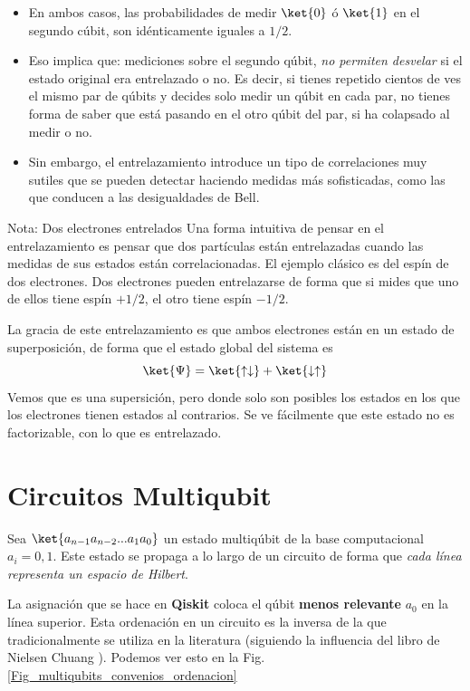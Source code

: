 \documentclass[a4paper,11pt]{book} %
\numberwithin{equation}{chapter}
\begin{document}
\begin{itemize}
	\item En ambos casos,  las probabilidades de medir $\ket{0}$ ó $\ket{1}$ en el segundo cúbit, son idénticamente iguales a $1/2$.
	
	\item Eso implica que: mediciones sobre el segundo qúbit, \textit{no permiten desvelar} si el estado original era entrelazado o no. Es decir, si tienes repetido cientos de ves el mismo par de qúbits y decides solo medir un qúbit en cada par, no tienes forma de saber que está pasando en el otro qúbit del par, si ha colapsado al medir o no.
	
	\item Sin embargo, el entrelazamiento introduce un tipo de correlaciones muy sutiles que se pueden detectar haciendo medidas más sofisticadas, como las que conducen a las desigualdades de Bell. 
\end{itemize}


	\begin{mybox_blue}{Nota: Dos electrones entrelados}
	Una forma intuitiva de pensar en el entrelazamiento es pensar que dos partículas están entrelazadas cuando las medidas de sus estados están correlacionadas. El ejemplo clásico es del espín de dos electrones. Dos electrones pueden entrelazarse de forma que si mides que uno de ellos tiene espín $+1/2$, el otro tiene espín $-1/2$. 

	\vspace{0.3cm}
La gracia de este entrelazamiento es que ambos electrones están en un estado de superposición, de forma que el estado global del sistema es
$$
\ket{\Psi} = \ket{\uparrow \downarrow} + \ket{\downarrow\uparrow}
$$
Vemos que es una supersición, pero donde solo son posibles los estados en los que los electrones tienen estados al contrarios. Se ve fácilmente que este estado no es factorizable, con lo que es entrelazado. 
	\end{mybox_blue}



    \section{Circuitos Multiqubit}

Sea $\ket{a_{n-1}a_{n-2}...a_1a_0}$ un estado multiqúbit de la base computacional $a_{i} = 0,1$. Este estado se propaga a lo largo de un circuito de forma que \textit{cada línea representa un espacio de Hilbert}. 

La asignación que se hace en \textbf{Qiskit }coloca el qúbit \textbf{menos relevante }$a_0$  en la  línea superior. Esta ordenación en un circuito es la inversa de la que tradicionalmente se utiliza en la literatura (siguiendo la influencia del libro de Nielsen Chuang \cite{bib_nielsen_chuang_2010}). Podemos ver esto en la Fig. \ref{Fig_multiqubits_convenios_ordenacion}
\end{document}

